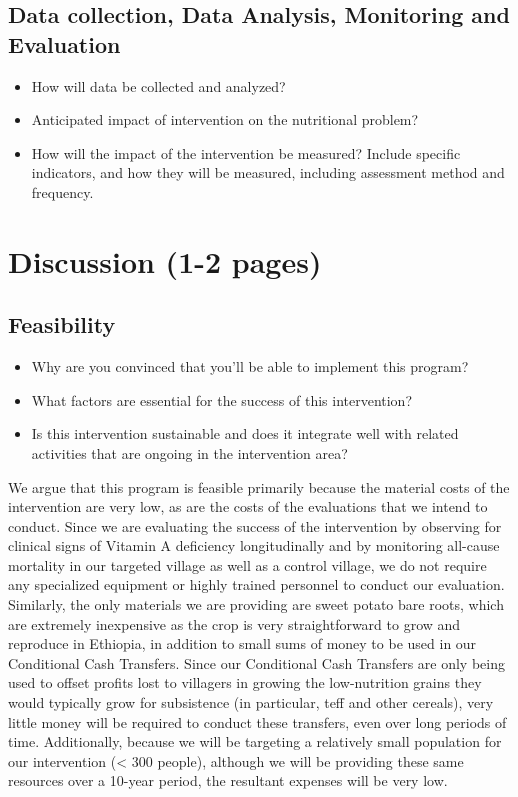 \documentclass[12pt, letterpaper, draft]{article}
\begin{document}
\subsection{Data collection, Data Analysis, Monitoring and Evaluation}
\begin{itemize}
    \item How will data be collected and analyzed?
    \item Anticipated impact of intervention on the nutritional problem?
    \item How will the impact of the intervention be measured? Include specific
    indicators, and how they will be measured, including assessment method and frequency.
\end{itemize}
\section{Discussion (1-2 pages)}
\subsection{Feasibility}
\begin{itemize}
    \item Why are you convinced that you'll be able to implement this program?
    \item What factors are essential for the success of this intervention?
    \item Is this intervention sustainable and does it integrate well
    with related activities that are ongoing in the intervention area?
\end{itemize}

We argue that this program is feasible primarily because the material costs of the intervention are very low, as are the costs of the evaluations that we intend to conduct. Since we are evaluating the success of the intervention by observing for clinical signs of Vitamin A deficiency longitudinally and by monitoring all-cause mortality in our targeted village as well as a control village, we do not require any specialized equipment or highly trained personnel to conduct our evaluation. Similarly, the only materials we are providing are sweet potato bare roots, which are extremely inexpensive as the crop is very straightforward to grow and reproduce in Ethiopia, in addition to small sums of money to be used in our Conditional Cash Transfers. Since our Conditional Cash Transfers are only being used to offset profits lost to villagers in growing the low-nutrition grains they would typically grow for subsistence (in particular, teff and other cereals), very little money will be required to conduct these transfers, even over long periods of time. Additionally, because we will be targeting a relatively small population for our intervention (< 300 people), although we will be providing these same resources over a 10-year period, the resultant expenses will be very low.
\end{document}
